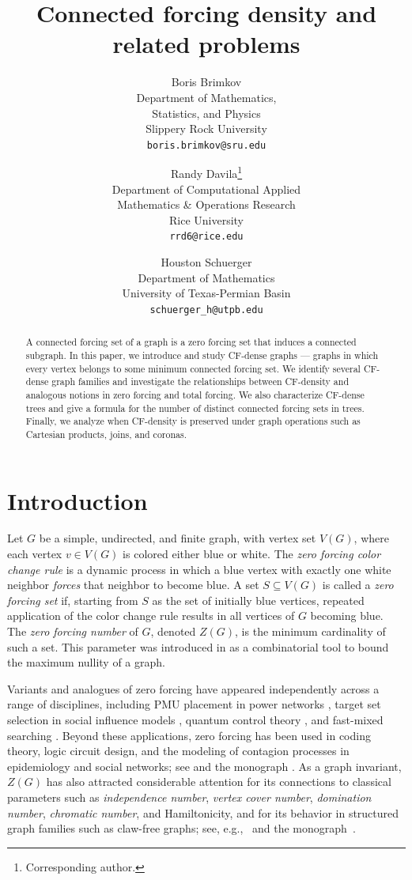 \documentclass[11pt]{article}
\title{Connected forcing density and related problems}
\author
    {Boris Brimkov \\
    \small Department of Mathematics,  \\
    \small Statistics, and Physics \\
    \small Slippery Rock University \\
    \small \texttt{boris.brimkov@sru.edu} \\ 
    \and
    Randy Davila\thanks{Corresponding author.} \\
    \small Department of Computational Applied \\ 
    \small Mathematics \& Operations Research \\ 
    \small Rice University \\ 
    \small \texttt{rrd6@rice.edu} 
    \and
    Houston Schuerger \\
    \small Department of Mathematics \\ 
    \small University of Texas-Permian Basin \\ 
    \small \texttt{schuerger\_h@utpb.edu} 
    }
\date{}
\theoremstyle{definition}
\newcommand{\1}{\vspace{0.1cm}}
\newcommand{\2}{\vspace{0.2cm}}
\newcommand{\3}{\vspace{0.3cm}}
\begin{document}
\maketitle

\begin{abstract}
A connected forcing set of a graph is a zero forcing set that induces a connected subgraph. In this paper, we introduce and study CF-dense graphs --- graphs in which every vertex belongs to some minimum connected forcing set. We identify several CF-dense graph families and investigate the relationships between CF-density and analogous notions in zero forcing and total forcing. We also characterize CF-dense trees and give a formula for the number of distinct connected forcing sets in trees. Finally, we analyze when CF-density is preserved under graph operations such as Cartesian products, joins, and coronas.
\end{abstract}


\section{Introduction}
\label{sec:intro}

Let $G$ be a simple, undirected, and finite graph, with vertex set $V(G)$, where each vertex $v \in V(G)$ is colored either blue or white. The \emph{zero forcing color change rule} is a dynamic process in which a blue vertex with exactly one white neighbor \emph{forces} that neighbor to become blue. A set $S \subseteq V(G)$ is called a \emph{zero forcing set} if, starting from $S$ as the set of initially blue vertices, repeated application of the color change rule results in all vertices of $G$ becoming blue. The \emph{zero forcing number} of $G$, denoted $Z(G)$, is the minimum cardinality of such a set. This parameter was introduced in \cite{AIM-Workshop} as a combinatorial tool to bound the maximum nullity of a graph.

Variants and analogues of zero forcing have appeared independently across a range of disciplines, including PMU placement in power networks \cite{BruneiHeath,powerdom3}, target set selection in social influence models \cite{target1,target3,target2}, quantum control theory \cite{quantum1}, and fast-mixed searching \cite{fast_mixed_search}. Beyond these applications, zero forcing has been used in coding theory, logic circuit design, and the modeling of contagion processes in epidemiology and social networks; see \cite{zf_tw,quantum1,logic1,zf_np} and the monograph \cite{HoLiSh-zero-forcing-book}. As a graph invariant, $Z(G)$ has also attracted considerable attention for its connections to classical parameters such as \emph{independence number}, \emph{vertex cover number}, \emph{domination number}, \emph{chromatic number}, and Hamiltonicity, and for its behavior in structured graph families such as claw-free graphs; see, e.g.,~\cite{k-forcing, upper-total-dom, vc, Da-15, Da-19, DaHe-20b, DaHe-20a, zfclaw, indep, join} and the monograph~\cite{HaHeHe2024}.
\end{document}
